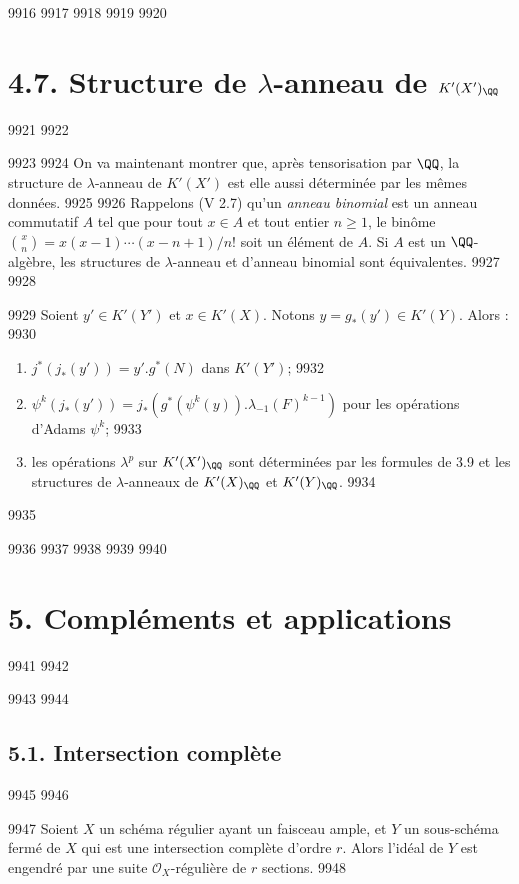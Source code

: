   9916	
  9917	\setcounter{section}{4}
  9918	\setcounter{proposition}{6}
  9919	
  9920	\section*{4.7. Structure de $\lambda$-anneau de $K'(X')_{\QQ}$}
  9921	
  9922	
  9923	
  9924	On va maintenant montrer que, après tensorisation par $\QQ$, la structure de $\lambda$-anneau de $K'(X')$ est elle aussi déterminée par les mêmes données.
  9925	
  9926	Rappelons (V 2.7) qu'un \emph{anneau binomial} est un anneau commutatif $A$ tel que pour tout $x \in A$ et tout entier $n \geq 1$, le binôme $\binom{x}{n} = x(x-1)\cdots(x-n+1)/n!$ soit un élément de $A$. Si $A$ est un $\QQ$-algèbre, les structures de $\lambda$-anneau et d'anneau binomial sont équivalentes.
  9927	
  9928	\begin{proposition}[4.7]%
  9929	Soient $y' \in K'(Y')$ et $x \in K'(X)$. Notons $y = g_*(y') \in K'(Y)$. Alors :
  9930	\begin{enumerate}
  9931	\item $j^*(j_*(y')) = y'.g^*(N)$ dans $K'(Y')$;
  9932	\item $\psi^k(j_*(y')) = j_*(g^*(\psi^k(y)).\lambda_{-1}(F)^{k-1})$ pour les opérations d'Adams $\psi^k$;
  9933	\item les opérations $\lambda^p$ sur $K'(X')_{\QQ}$ sont déterminées par les formules de 3.9 et les structures de $\lambda$-anneaux de $K'(X)_{\QQ}$ et $K'(Y)_{\QQ}$.
  9934	\end{enumerate}
  9935	\end{proposition}
  9936	
  9937	\setcounter{section}{5}
  9938	\setcounter{proposition}{0}
  9939	
  9940	\section*{5. Compléments et applications}
  9941	
  9942	
  9943	
  9944	\subsection*{5.1. Intersection complète}
  9945	
  9946	\begin{proposition}[5.1]%
  9947	Soient $X$ un schéma régulier ayant un faisceau ample, et $Y$ un sous-schéma fermé de $X$ qui est une intersection complète d'ordre $r$. Alors l'idéal de $Y$ est engendré par une suite $\mathscr{O}_X$-régulière de $r$ sections.
  9948	\end{proposition}
